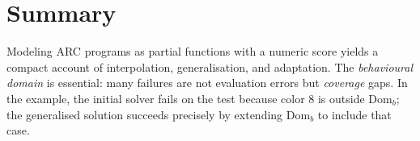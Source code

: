 \documentclass[11pt]{article}
\newcommand{\Domb}{\mathrm{Dom}_b}
\begin{document}
\section{Summary}

Modeling ARC programs as partial functions with a numeric score yields a compact account of interpolation, generalisation, and adaptation. The \emph{behavioural domain} is essential: many failures are not evaluation errors but \emph{coverage} gaps. In the example, the initial solver fails on the test because color $8$ is outside $\Domb$; the generalised solution succeeds precisely by extending $\Domb$ to include that case.
\end{document}
